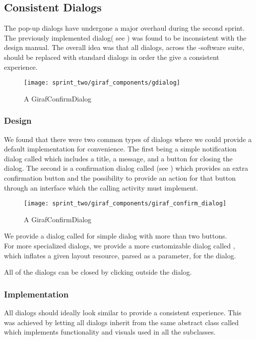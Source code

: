 \subsection{Consistent Dialogs}
\label{sec:consistent_dialogs}

The pop-up dialogs have undergone a major overhaul during the second sprint. The previously implemented dialog( see ) was found to be inconsistent with the \giraf design manual. The overall idea was that all dialogs, across the \giraf-software suite, should be replaced with standard dialogs in order the give a consistent experience. 

\begin{figure}[!htbp]
    \centering
    \texttt{[image: sprint\_two/giraf\_components/gdialog]}
    \caption{A GirafConfirmDialog}
    \label{fig:gdialog}
\end{figure}

\subsubsection{Design}

We found that there were two common types of dialogs where we could provide a default implementation for convenience. The first being a simple notification dialog called  which includes a title, a message, and a button for closing the dialog. The second is a confirmation dialog called  (see ) which provides an extra confirmation button and the possibility to provide an action for that button through an interface which the calling activity must implement. 

\begin{figure}[!htbp]
    \centering
    \texttt{[image: sprint\_two/giraf\_components/giraf\_confirm\_dialog]}
    \caption{A GirafConfirmDialog}
    \label{fig:giraf_confirm_dialog}
\end{figure}

We provide a dialog called  for simple dialog with more than two buttons.\\

For more specialized dialogs, we provide a more customizable dialog called , which inflates a given layout resource, parsed as a parameter, for the dialog.

All of the dialogs can be closed by clicking outside the dialog.

\subsubsection{Implementation}

All dialogs should ideally look similar to provide a consistent experience. This was achieved by letting all dialogs inherit from the same abstract class called  which implements functionality and visuals used in all the subclasses.


